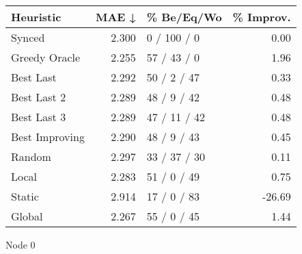 \begin{tabular}{lrlr}
\toprule
\textbf{Heuristic} & \textbf{MAE ↓} & \textbf{\% Be/Eq/Wo} & \textbf{\% Improv.} \\
\midrule
            Synced &          2.300 &          0 / 100 / 0 &                0.00 \\
     Greedy Oracle &          2.255 &          57 / 43 / 0 &                1.96 \\
         Best Last &          2.292 &          50 / 2 / 47 &                0.33 \\
       Best Last 2 &          2.289 &          48 / 9 / 42 &                0.48 \\
       Best Last 3 &          2.289 &         47 / 11 / 42 &                0.48 \\
    Best Improving &          2.290 &          48 / 9 / 43 &                0.45 \\
            Random &          2.297 &         33 / 37 / 30 &                0.11 \\
             Local &          2.283 &          51 / 0 / 49 &                0.75 \\
            Static &          2.914 &          17 / 0 / 83 &              -26.69 \\
            Global &          2.267 &          55 / 0 / 45 &                1.44 \\
\bottomrule
\end{tabular}
\caption{Node 0}
\label{tab:hr_iid_lr01_le1_bs2_0}
